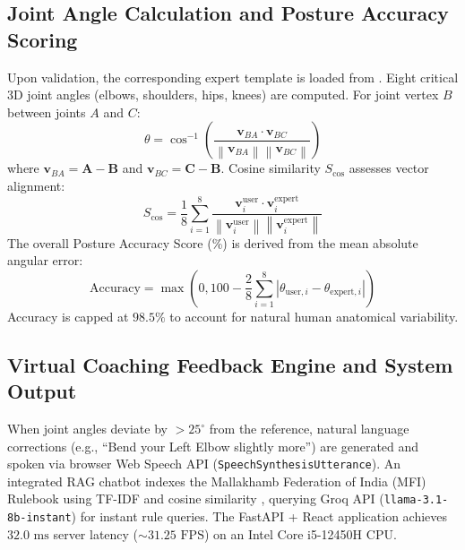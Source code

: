 \documentclass{ieeeaccess}
\begin{document}
\subsection{Joint Angle Calculation and Posture Accuracy Scoring}
Upon validation, the corresponding expert template is loaded from . Eight critical 3D joint angles (elbows, shoulders, hips, knees) are computed. For joint vertex $B$ between joints $A$ and $C$:
\begin{equation}
\theta = \cos^{-1} \left( \frac{\mathbf{v}_{BA}\cdot\mathbf{v}_{BC}}{\left\lVert\mathbf{v}_{BA}\right\rVert \left\lVert\mathbf{v}_{BC}\right\rVert} \right)
\label{eq:joint_angle}
\end{equation}
where $\mathbf{v}_{BA}=\mathbf{A}-\mathbf{B}$ and $\mathbf{v}_{BC}=\mathbf{C}-\mathbf{B}$. Cosine similarity $S_{\mathrm{cos}}$ assesses vector alignment:
\begin{equation}
S_{\mathrm{cos}} = \frac{1}{8} \sum_{i=1}^{8} \frac{\mathbf{v}^{\mathrm{user}}_i \cdot \mathbf{v}^{\mathrm{expert}}_i}{\left\lVert\mathbf{v}^{\mathrm{user}}_i\right\rVert \left\lVert\mathbf{v}^{\mathrm{expert}}_i\right\rVert}
\label{eq:cosine_similarity}
\end{equation}
The overall Posture Accuracy Score (\%) is derived from the mean absolute angular error:
\begin{equation}
\mathrm{Accuracy} = \max\left(0, 100 - \frac{2}{8} \sum_{i=1}^{8} \left| \theta_{\mathrm{user},i} - \theta_{\mathrm{expert},i} \right| \right)
\label{eq:accuracy}
\end{equation}
Accuracy is capped at $98.5\%$ to account for natural human anatomical variability.

\subsection{Virtual Coaching Feedback Engine and System Output}
When joint angles deviate by $> 25^{\circ}$ from the reference, natural language corrections (e.g., ``Bend your Left Elbow slightly more'') are generated and spoken via browser Web Speech API (\texttt{SpeechSynthesisUtterance}). An integrated RAG chatbot \cite{b10} indexes the Mallakhamb Federation of India (MFI) Rulebook using TF-IDF and cosine similarity \cite{b5}, querying Groq API (\texttt{llama-3.1-8b-instant}) for instant rule queries. The FastAPI + React application achieves $32.0\text{ ms}$ server latency ($\sim 31.25\text{ FPS}$) on an Intel Core i5-12450H CPU.
\end{document}
